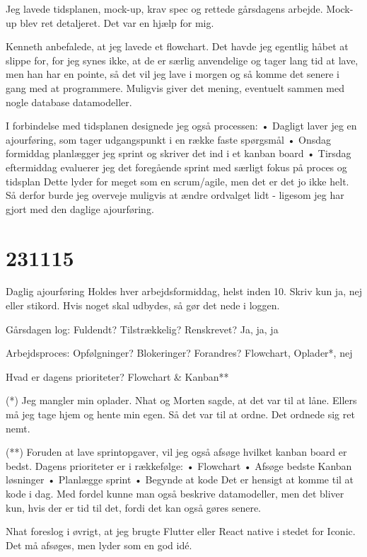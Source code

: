 \documentclass{report}
\begin{document}
Jeg lavede tidsplanen, mock-up, krav spec og rettede gårsdagens arbejde.
Mock-up blev ret detaljeret. Det var en hjælp for mig.
 
Kenneth anbefalede, at jeg lavede et flowchart. Det havde jeg egentlig håbet at slippe for, for jeg synes ikke, at de er særlig anvendelige og tager lang tid at lave, men han har en pointe, så det vil jeg lave i morgen og så komme det senere i gang med at programmere. Muligvis giver det mening, 
eventuelt sammen med nogle database datamodeller.
 
I forbindelse med tidsplanen designede jeg også processen:
•	Dagligt laver jeg en ajourføring, som tager udgangspunkt i en række faste spørgsmål
•	Onsdag formiddag planlægger jeg sprint og skriver det ind i et kanban board
•	Tirsdag eftermiddag evaluerer jeg det foregående sprint med særligt fokus på proces og tidsplan
Dette lyder for meget som en scrum/agile, men det er det jo ikke helt. Så derfor burde jeg overveje muligvis at ændre ordvalget lidt - ligesom jeg har gjort med den daglige ajourføring.

\section{231115}
Daglig ajourføring
Holdes hver arbejdsformiddag, helst inden 10. Skriv kun ja, nej eller stikord. Hvis noget skal udbydes, så gør det nede i loggen.
 
Gårsdagen log: Fuldendt? Tilstrækkelig? Renskrevet?
Ja, ja, ja
 
Arbejdsproces: Opfølgninger? Blokeringer? Forandres?
Flowchart, Oplader*, nej
 
Hvad er dagens prioriteter?
Flowchart \& Kanban**
 
(*) Jeg mangler min oplader. Nhat og Morten sagde, at det var til at låne. Ellers må jeg tage hjem og hente min egen. Så det var til at ordne. Det ordnede sig ret nemt.
 
(**) Foruden at lave sprintopgaver, vil jeg også afsøge hvilket kanban board er bedst.
Dagens prioriteter er i rækkefølge:
•	Flowchart
•	Afsøge bedste Kanban løsninger
•	Planlægge sprint
•	Begynde at kode
Det er hensigt at komme til at kode i dag. Med fordel kunne man også beskrive datamodeller, men det bliver kun, hvis der er tid til det, fordi det kan også gøres senere.
 
Nhat foreslog i øvrigt, at jeg brugte Flutter eller React native i stedet for Iconic.  Det må afsøges, men lyder som en god idé.
 
\end{document}
